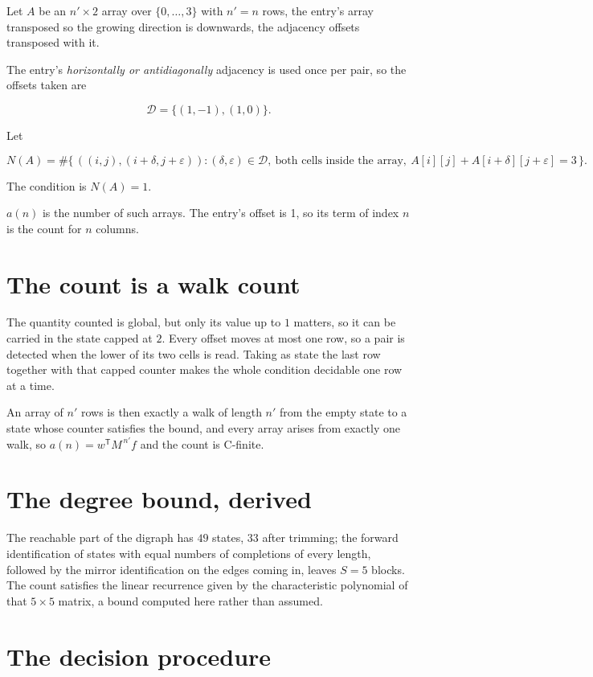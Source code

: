 \documentclass[11pt]{article}
\theoremstyle{definition}
\begin{document}
Let $A$ be an $n' \times 2$ array over $\{0,\dots,3\}$ with $n' = n$ rows, the entry's array transposed so the growing direction is downwards, the adjacency offsets transposed with it.

The entry's {\itshape horizontally or antidiagonally} adjacency is used once per pair, so the offsets taken are

\[\mathcal{D} = \{(1,-1), (1,0)\}.\]

Let

\[N(A) = \#\bigl\{\,((i,j),(i{+}\delta,j{+}\varepsilon)) : (\delta,\varepsilon) \in \mathcal{D},\ \text{both cells inside the array},\ A[i][j] + A[i{+}\delta][j{+}\varepsilon] = 3\,\bigr\}.\]

The condition is $N(A) = 1$.

$a(n)$ is the number of such arrays. The entry's offset is 1, so its term of index $n$ is the count for $n$ columns.

\section{The count is a walk count}

The quantity counted is global, but only its value up to $1$ matters, so it can be carried in the state capped at $2$. Every offset moves at most one row, so a pair is detected when the lower of its two cells is read. Taking as state the last row together with that capped counter makes the whole condition decidable one row at a time.

An array of $n'$ rows is then exactly a walk of length $n'$ from the empty state to a state whose counter satisfies the bound, and every array arises from exactly one walk, so $a(n) = w^{\mathsf T}M^{\,n'}f$ and the count is C-finite.

\section{The degree bound, derived}

The reachable part of the digraph has $49$ states, $33$ after trimming; the forward identification of states with equal numbers of completions of every length, followed by the mirror identification on the edges coming in, leaves $S = 5$ blocks. The count satisfies the linear recurrence given by the characteristic polynomial of that $5\times5$ matrix, a bound computed here rather than assumed.

\section{The decision procedure}
\end{document}

